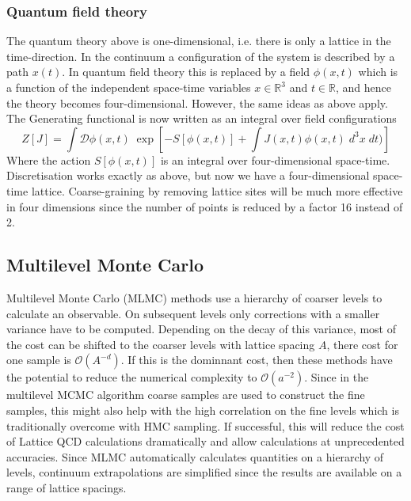 \documentclass[11pt]{article}
\renewcommand{\vec}[1]{{#1}}
\begin{document}
\subsubsection{Quantum field theory}
The quantum theory above is one-dimensional, i.e. there is only a lattice in the time-direction. In the continuum a configuration of the system is described by a path $x(t)$. In quantum field theory this is replaced by a field $\phi(\vec{x},t)$ which is a function of the independent space-time variables $\vec{x}\in\mathbb{R}^3$ and $t\in\mathbb{R}$, and hence the theory becomes four-dimensional. However, the same ideas as above apply. The Generating functional is now written as an integral over field configurations
\begin{equation}
Z[J] = \int\mathcal{D}\phi(\vec{x},t)\;\exp\left[-S[\phi(\vec{x},t)]+\int
  J(\vec{x},t)\phi(\vec{x},t)\;d^3\vec{x}\;dt)\right]
\end{equation}
Where the action $S[\phi(\vec{x},t)]$ is an integral over four-dimensional space-time. Discretisation works exactly as above, but now we have a four-dimensional space-time lattice. Coarse-graining by removing lattice sites will be much more effective in four dimensions since the number of points is reduced by a factor 16 instead of 2.
\subsection{Multilevel Monte Carlo}
Multilevel Monte Carlo (MLMC) methods \cite{Heinrich2001,Giles2008,Giles2015} use a hierarchy of coarser levels to calculate an observable. On subsequent levels only corrections with a smaller variance have to be computed. Depending on the decay of this variance, most of the cost can be shifted to the coarser levels with lattice spacing $A$, there cost for one sample is $\mathcal{O}(A^{-d})$. If this is the dominnant cost, then these methods have the potential to reduce the numerical complexity to $\mathcal{O}(a^{-2})$. Since in the multilevel MCMC algorithm \cite{Dodwell2015} coarse samples are used to construct the fine samples, this might also help with the high correlation on the fine levels which is traditionally overcome with HMC sampling. If successful, this will reduce the cost of Lattice QCD calculations dramatically and allow calculations at unprecedented accuracies. Since MLMC automatically calculates quantities on a hierarchy of levels, continuum extrapolations are simplified since the results are available on a range of lattice spacings.
\end{document}
